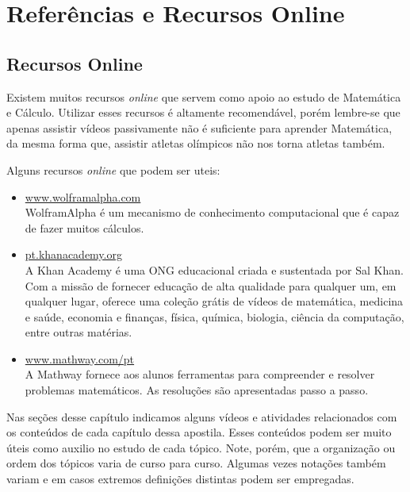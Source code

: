 \chapter{Referências e Recursos Online}
\label{cap:Recursos_Online}

\minitoc

\section{Recursos Online}

Existem muitos recursos \textit{online} que servem como apoio ao estudo de Matemática e Cálculo.
Utilizar esses recursos é altamente recomendável, porém lembre-se que apenas assistir vídeos passivamente
não é suficiente para aprender Matemática, da mesma forma que, assistir atletas olímpicos não nos torna
atletas também.

Alguns recursos \textit{online} que podem ser uteis:
\begin{itemize}[topsep=-0.7\baselineskip]
    \item \href{http://www.wolframalpha.com}{www.wolframalpha.com} \\
         WolframAlpha é um mecanismo de conhecimento computacional
         que é capaz de fazer muitos cálculos.

    \item \href{http://pt.khanacademy.org}{pt.khanacademy.org} \\
        A Khan Academy é uma ONG educacional criada e sustentada por Sal Khan.
        Com a missão de fornecer educação de alta qualidade para qualquer um, em qualquer lugar,
        oferece uma coleção grátis de vídeos de matemática, medicina e saúde, economia e finanças,
        física, química, biologia, ciência da computação, entre outras matérias.

    \item \href{http://www.mathway.com/pt}{www.mathway.com/pt} \\
        A Mathway fornece aos alunos ferramentas para compreender e
        resolver problemas matemáticos.
        As resoluções são apresentadas passo a passo.

\end{itemize}

Nas seções desse capítulo indicamos alguns vídeos e atividades relacionados com os conteúdos de cada
capítulo dessa apostila. Esses conteúdos podem ser muito úteis como auxilio no estudo de cada tópico.
Note, porém, que a organização ou ordem dos tópicos varia de curso para curso. Algumas vezes notações
também variam e em casos extremos definições distintas podem ser empregadas.

